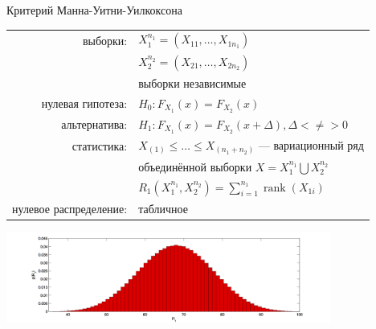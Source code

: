 \documentclass[9pt,pdf,utf8,hyperref={unicode},aspectratio=169]{beamer}
\DeclareMathOperator{\rank}{rank}
\renewcommand{\leq}{\leqslant}
\begin{document}
\begin{frame}[label=mannwhitney]{Критерий Манна-Уитни-Уилкоксона}
   \begin{center}
     \begin{tabular}{rl}
         выборки:                        & $X_1^{n_1}=\left(X_{11},\ldots,X_{1n_1}\right)$         \\
                                         & $X_2^{n_2} = \left(X_{21},\ldots,X_{2n_2}\right)$ \\ 
                                         & выборки независимые\\
         нулевая гипотеза:               & $H_0\colon F_{X_1}\left(x\right) = F_{X_2}\left(x\right)$ \\
         альтернатива:                   & $H_1\colon F_{X_1}\left(x\right) = F_{X_2}\left(x+\Delta\right), \Delta <\neq> 0$ \\
         статистика:                     & $X_{(1)}\leq\ldots\leq X_{(n_1+n_2)}$ --- вариационный ряд \\
                                         & объединённой выборки $X = X_1^{n_1} \bigcup X_2^{n_2}$ \\
                                         & $R_1\left(X_1^{n_1}, X_2^{n_2}\right) = \sum\limits_{i=1}^{n_1} \rank\left(X_{1i}\right)$ \\
         нулевое распределение:          & табличное\\
     \end{tabular}
     \includegraphics[width=0.8\textwidth]{mann.png}
 \end{center}
 
\end{frame}
\end{document}

